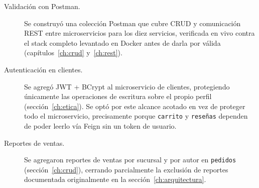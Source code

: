 \begin{description}
    \item[Validación con Postman.] Se construyó una colección Postman que cubre CRUD y
    comunicación REST entre microservicios para los diez servicios, verificada en vivo
    contra el stack completo levantado en Docker antes de darla por válida
    (capítulos~\ref{ch:crud} y~\ref{ch:rest}).
    \item[Autenticación en clientes.] Se agregó JWT + BCrypt al microservicio de
    clientes, protegiendo únicamente las operaciones de escritura sobre el propio
    perfil (sección~\ref{ch:etica}). Se optó por este alcance acotado en vez de
    proteger todo el microservicio, precisamente porque \texttt{carrito} y
    \texttt{reseñas} dependen de poder leerlo vía Feign sin un token de usuario.
    \item[Reportes de ventas.] Se agregaron reportes de ventas por sucursal y por
    autor en \texttt{pedidos} (sección~\ref{ch:crud}), cerrando parcialmente la
    exclusión de reportes documentada originalmente en la sección~\ref{ch:arquitectura}.
\end{description}
